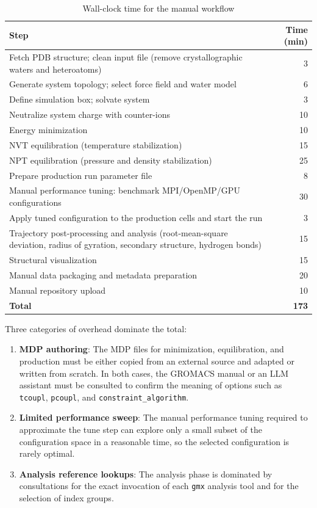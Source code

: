 \documentclass[
  digital,     %
  color,       %
  oneside,     %
  nosansbold,  %
  nocolorbold, %
  lof,         %
  lot,         %
]{fithesis4}
\begin{document}
\begin{table}[H]
\caption{Wall-clock time for the manual workflow}
\label{tab:manual-timings}
\begin{tabularx}{\linewidth}{Xr}
\hline
\textbf{Step} & \textbf{Time (min)} \\
\hline
Fetch PDB structure; clean input file (remove crystallographic waters and heteroatoms) & 3 \\
Generate system topology; select force field and water model & 6 \\
Define simulation box; solvate system & 3 \\
Neutralize system charge with counter-ions & 10 \\
Energy minimization & 10 \\
NVT equilibration (temperature stabilization) & 15 \\
NPT equilibration (pressure and density stabilization) & 25 \\
Prepare production run parameter file & 8 \\
Manual performance tuning: benchmark MPI/OpenMP/GPU configurations & 30 \\
Apply tuned configuration to the production cells and start the run & 3 \\
Trajectory post-processing and analysis (root-mean-square deviation, radius of gyration, secondary structure, hydrogen bonds) & 15 \\
Structural visualization & 15 \\
Manual data packaging and metadata preparation & 20 \\
Manual repository upload & 10 \\
\hline
\textbf{Total} & \textbf{173} \\
\hline
\end{tabularx}
\end{table}

Three categories of overhead dominate the total:

\begin{enumerate}
    \item \textbf{MDP authoring}: The MDP files for minimization, equilibration, and production must be either copied from an external source and adapted or written from scratch. In both cases, the GROMACS manual or an LLM assistant must be consulted to confirm the meaning of options such as \texttt{tcoupl}, \texttt{pcoupl}, and \texttt{constraint\_algorithm}.
    \item \textbf{Limited performance sweep}: The manual performance tuning required to approximate the tune step can explore only a small subset of the configuration space in a reasonable time, so the selected configuration is rarely optimal.
    \item \textbf{Analysis reference lookups}: The analysis phase is dominated by consultations for the exact invocation of each \texttt{gmx} analysis tool and for the selection of index groups.
\end{enumerate}
\end{document}
